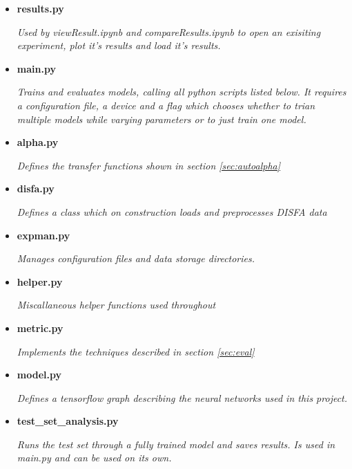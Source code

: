 {\begin{itemize}
\begin{itemize}
                  \item {\bf results.py }
                  \begin{sloppypar} \textit{Used by viewResult.ipynb and compareResults.ipynb to open an exisiting experiment, plot it's results and load it's results.}\end{sloppypar}
                  \item {\bf main.py }
                  \begin{sloppypar} \textit{Trains and evaluates models, calling all python scripts listed below. It requires a configuration file, a device and a flag which chooses whether to trian multiple models while varying parameters or to just train one model.}\end{sloppypar}
                  \item {\bf alpha.py }
                  \begin{sloppypar} \textit{Defines the transfer functions shown in section \ref{sec:autoalpha} }\end{sloppypar}
                  \item {\bf disfa.py }
                  \begin{sloppypar} \textit{Defines a class which on construction loads and preprocesses DISFA data}\end{sloppypar}
                  \item {\bf expman.py }
                  \begin{sloppypar} \textit{Manages configuration files and data storage directories.}\end{sloppypar}
                  \item {\bf helper.py }
                  \begin{sloppypar} \textit{Miscallaneous helper functions used throughout}\end{sloppypar}
                  \item {\bf metric.py }
                  \begin{sloppypar} \textit{Implements the techniques described in section \ref{sec:eval} }\end{sloppypar}
                  \item {\bf model.py }
                  \begin{sloppypar} \textit{Defines a tensorflow graph describing the neural networks used in this project.}\end{sloppypar}
                  \item {\bf test\_set\_analysis.py }
                  \begin{sloppypar} \textit{Runs the test set through a fully trained model and saves results. Is used in main.py and can be used on its own.}\end{sloppypar}

\end{itemize}
\end{itemize}}
